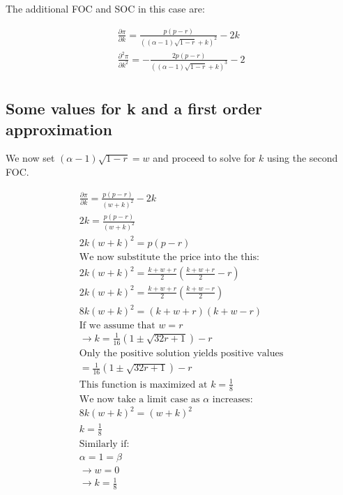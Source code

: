 \documentclass[11pt]{article}
\begin{document}
The additional FOC and SOC in this case are: 

\begin{align*}
\frac{\partial \pi}{\partial k} = \frac{ p(p-r)}{((\alpha-1)
\sqrt{ 1-r }
+k)^2} -2k
\\
\frac{\partial^2 \pi}{\partial k^2} = -\frac{2 p(p-r)}{((\alpha-1)
\sqrt{ 1-r }
+k)^3} -2
\\    
\end{align*}

\subsection{Some values for k and a first order approximation}

\label{kapp}

We now set $ (\alpha-1)\sqrt{ 1 -r }=w$ and proceed to solve for $k$ using the second FOC.  

\begin{align*}
\frac{\partial \pi}{\partial k} = \frac{ p(p-r)}{(w
+k)^2} -2k \\
2k= \frac{ p(p-r)}{(w
+k)^2} \\
2k(w+k)^2=p(p-r) \\
\text{We now substitute the price into the this: } \\
2k(w+k)^2=\frac{k+ w+r}{2} \left(\frac{k+ w+r}{2}-r \right) \\
2k(w+k)^2=\frac{k+ w+r}{2} \left(\frac{k+ w-r}{2} \right) \\
8k(w+k)^2= \left( k+ w+r \right) \left(k+ w-r\right) \\
\text{If we assume that $w=r$} \\
\rightarrow 
k = \frac{1}{16} \left(1\pm \sqrt{32 r+1}\right) - r\\
\text{Only the positive solution yields positive values} \\
= \frac{1}{16} \left(1\pm \sqrt{32 r+1}\right) - r \\
\text{This function is maximized at $k=\frac{1}{8}$} \\
\text{We now take a limit case as $\alpha$ increases:} \\
8k(w+k)^2= \left( w+ k \right)^2 \\
k = \frac{1}{8} \\
\text{Similarly if:} \\
\alpha=1=\beta \\
\rightarrow w = 0 \\
\rightarrow k = \frac{1}{8} 
\end{align*}
\end{document}
